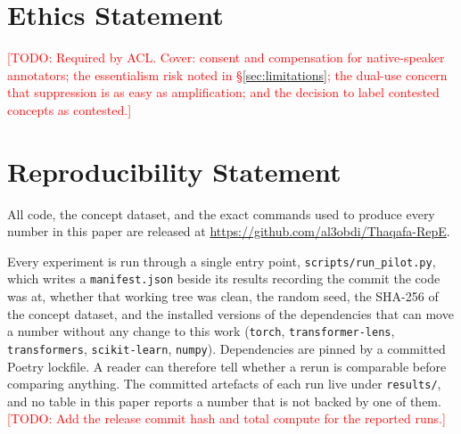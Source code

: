 \documentclass[11pt,a4paper]{article}
\newcommand{\todo}[1]{\textcolor{red}{[TODO: #1]}}
\begin{document}
\section*{Ethics Statement}
\todo{Required by ACL. Cover: consent and compensation for native-speaker
annotators; the essentialism risk noted in \S\ref{sec:limitations}; the dual-use
concern that suppression is as easy as amplification; and the decision to label
contested concepts as contested.}

\section*{Reproducibility Statement}
All code, the concept dataset, and the exact commands used to produce every
number in this paper are released at
\url{https://github.com/al3obdi/Thaqafa-RepE}.

Every experiment is run through a single entry point,
\texttt{scripts/run\_pilot.py}, which writes a \texttt{manifest.json} beside its
results recording the commit the code was at, whether that working tree was
clean, the random seed, the SHA-256 of the concept dataset, and the installed
versions of the dependencies that can move a number without any change to this
work (\texttt{torch}, \texttt{transformer-lens}, \texttt{transformers},
\texttt{scikit-learn}, \texttt{numpy}). Dependencies are pinned by a committed
Poetry lockfile. A reader can therefore tell whether a rerun is comparable
before comparing anything. The committed artefacts of each run live under
\texttt{results/}, and no table in this paper reports a number that is not
backed by one of them.
\todo{Add the release commit hash and total compute for the reported runs.}



\end{document}
